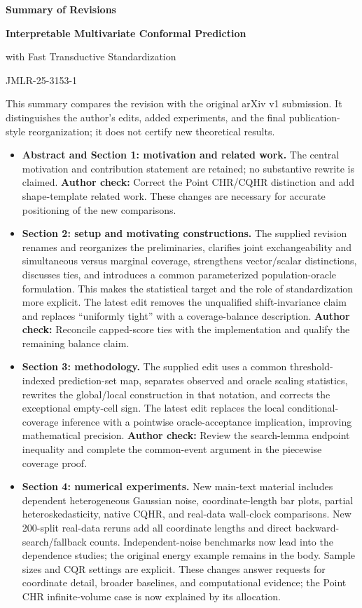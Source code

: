 \documentclass[10pt]{article}
\newcommand{\checkauthor}[1]{\textcolor{red!65!black}{\textbf{Author check:} #1}}
\begin{document}
\begin{center}
{\Large\bfseries Summary of Revisions}\par
\vspace{0.3em}
{\bfseries Interpretable Multivariate Conformal Prediction\par
with Fast Transductive Standardization}\par
JMLR-25-3153-1
\end{center}

This summary compares the revision with the original arXiv v1 submission.
It distinguishes the author's edits, added experiments, and the final
publication-style reorganization; it does not certify new theoretical results.

\begin{itemize}
\item \textbf{Abstract and Section 1: motivation and related work.}
The central motivation and contribution statement are retained; no substantive
rewrite is claimed. \checkauthor{Correct the Point CHR/CQHR distinction and
add shape-template related work.} These changes are necessary for accurate
positioning of the new comparisons.

\item \textbf{Section 2: setup and motivating constructions.}
The supplied revision renames and reorganizes the preliminaries, clarifies
joint exchangeability and simultaneous versus marginal coverage, strengthens
vector/scalar distinctions, discusses ties, and introduces a common
parameterized population-oracle formulation. This makes the statistical
target and the role of standardization more explicit.
The latest edit removes the unqualified shift-invariance claim and replaces
``uniformly tight'' with a coverage-balance description.
\checkauthor{Reconcile capped-score ties with the implementation and qualify
the remaining balance claim.}

\item \textbf{Section 3: methodology.}
The supplied edit uses a common threshold-indexed prediction-set map,
separates observed and oracle scaling statistics, rewrites the global/local
construction in that notation, and corrects the exceptional empty-cell sign.
The latest edit replaces the local conditional-coverage inference with a
pointwise oracle-acceptance implication, improving mathematical precision.
\checkauthor{Review the search-lemma endpoint inequality and complete the
common-event argument in the piecewise coverage proof.}

\item \textbf{Section 4: numerical experiments.}
New main-text material includes dependent heterogeneous Gaussian noise,
coordinate-length bar plots, partial heteroskedasticity, native CQHR, and
real-data wall-clock comparisons. New 200-split real-data reruns add all
coordinate lengths and direct backward-search/fallback counts. Independent-noise
benchmarks now lead into the dependence studies; the original energy example
remains in the body. Sample sizes and CQR settings are explicit. These changes
answer requests for coordinate detail, broader baselines, and computational
evidence; the Point CHR infinite-volume case is now explained by its allocation.


\end{itemize}
\end{document}
